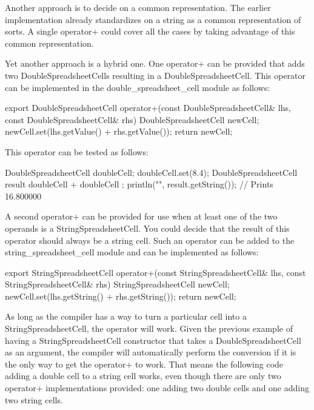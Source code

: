 Another approach is to decide on a common representation. The earlier implementation already standardizes on a string as a common representation of sorts. A single operator+ could cover all the cases by taking advantage of this common representation.

Yet another approach is a hybrid one. One operator+ can be provided that adds two DoubleSpreadsheetCells resulting in a DoubleSpreadsheetCell. This operator can be implemented in the double\_spreadsheet\_cell module as follows:

\begin{cpp}
export DoubleSpreadsheetCell operator+(const DoubleSpreadsheetCell& lhs,
                                       const DoubleSpreadsheetCell& rhs)
{
    DoubleSpreadsheetCell newCell;
    newCell.set(lhs.getValue() + rhs.getValue());
    return newCell;
}
\end{cpp}

This operator can be tested as follows:

\begin{cpp}
DoubleSpreadsheetCell doubleCell; doubleCell.set(8.4);
DoubleSpreadsheetCell result { doubleCell + doubleCell };
println("{}", result.getString()); // Prints 16.800000
\end{cpp}

A second operator+ can be provided for use when at least one of the two operands is a StringSpreadsheetCell. You could decide that the result of this operator should always be a string cell. Such an operator can be added to the string\_spreadsheet\_cell module and can be implemented as follows:

\begin{cpp}
export StringSpreadsheetCell operator+(const StringSpreadsheetCell& lhs,
                                       const StringSpreadsheetCell& rhs)
{
    StringSpreadsheetCell newCell;
    newCell.set(lhs.getString() + rhs.getString());
    return newCell;
}
\end{cpp}

As long as the compiler has a way to turn a particular cell into a StringSpreadsheetCell, the operator will work. Given the previous example of having a StringSpreadsheetCell constructor that takes a DoubleSpreadsheetCell as an argument, the compiler will automatically perform the conversion if it is the only way to get the operator+ to work. That means the following code adding a double cell to a string cell works, even though there are only two operator+ implementations provided: one adding two double cells and one adding two string cells.


